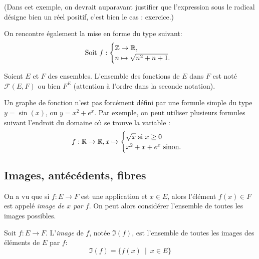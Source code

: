 (Dans cet exemple, on devrait auparavant justifier que l'expression sous le radical désigne bien un réel positif, c'est bien le cas : exercice.)

On rencontre également la mise en forme du type suivant:
\[
\text{ Soit } f :\begin{cases}\mathbb{Z} \to \mathbb{R},\\ n\mapsto \sqrt{n^2+n+1}.\end{cases}
\]
\begin{definition}
Soient $E$ et $F$ des ensembles. L'ensemble des fonctions de $E$ dans $F$ est noté $\mathcal F(E,F)$ ou bien $F^E$ (attention à l'ordre dans la seconde notation).
\end{definition}

\begin{remarque}
Un graphe de fonction n'est pas forcément défini par une formule simple du type $y=\sin(x)$, ou $y=x^2+e^x$. Par exemple, on peut utiliser plusieurs formules suivant l'endroit du domaine où se trouve la variable :
\[ f: 
\mathbb{R} \to \mathbb{R}, 
x\mapsto \begin{cases}\sqrt{x}\text{ si }x\geq 0\\ x^2+x+e^x\text{ sinon.}\end{cases}\]
\end{remarque}

\subsection{Images, antécédents, fibres}

On a vu que si $f : E\to F$ est une application et $x\in E$, alors l'élément $f(x)\in F$ est appelé \emph{image de $x$ par $f$}. On peut alors considérer l'ensemble de toutes les images possibles.

\begin{definition}
Soit $f : E\to F$. L'\emph{image} de $f$, notée $\Im(f)$, est l'ensemble de toutes les images des éléments de $E$ par $f$:
\[
\Im(f) = \{f(x)\:\mid\: x\in E\}
\]
\end{definition}

